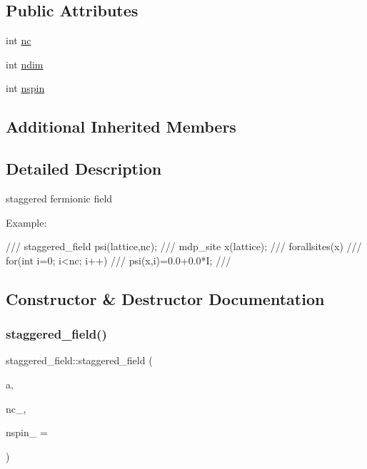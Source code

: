 \subsection*{Public Attributes}
\begin{DoxyCompactItemize}
\item 
int \hyperlink{classstaggered__field_a4ac408eebebb6b76ac209479df87459a}{nc}
\item 
int \hyperlink{classstaggered__field_a52eed99381c8e8649c6e79ec0fe7a4b8}{ndim}
\item 
int \hyperlink{classstaggered__field_aac06f4fadf069a57cda02bec2ecd8bda}{nspin}
\end{DoxyCompactItemize}
\subsection*{Additional Inherited Members}


\subsection{Detailed Description}
staggered fermionic field 

Example\+: \begin{DoxyVerb}/// staggered_field psi(lattice,nc);
/// mdp_site x(lattice);
/// forallsites(x)
///   for(int i=0; i<nc; i++)
///     psi(x,i)=0.0+0.0*I;
/// \end{DoxyVerb}
 

\subsection{Constructor \& Destructor Documentation}
\mbox{\label{classstaggered__field_acc7d5a171caf8bda9d0a904c6672432d}} 
\subsubsection{\texorpdfstring{staggered\+\_\+field()}{staggered\_field()}\hspace{0.1cm}{\footnotesize\ttfamily [1/2]}}
{\footnotesize\ttfamily staggered\+\_\+field\+::staggered\+\_\+field (\begin{DoxyParamCaption}\item[{\hyperlink{classmdp__lattice}{mdp\+\_\+lattice} \&}]{a,  }\item[{int}]{nc\+\_\+,  }\item[{int}]{nspin\+\_\+ = {} }\end{DoxyParamCaption})\hspace{0.3cm}{\ttfamily [inline]}}

